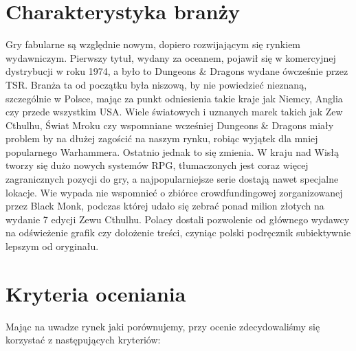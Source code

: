 \documentclass[a4paper,11pt]{article}
\begin{document}
\setcounter{page}{2}

\section {Charakterystyka branży}

Gry fabularne są względnie nowym, dopiero rozwijającym się rynkiem wydawniczym. Pierwszy tytuł, wydany za oceanem, pojawił się w komercyjnej dystrybucji w roku 1974, a było to Dungeons \& Dragons wydane ówcześnie przez TSR. Branża ta od początku była niszową, by nie powiedzieć nieznaną, szczególnie w Polsce, mając za punkt odniesienia takie kraje jak Niemcy, Anglia czy przede wszystkim USA. Wiele światowych i uznanych marek takich jak Zew Cthulhu, Świat Mroku czy wspomniane wcześniej Dungeons \& Dragons miały problem by na dłużej zagościć na naszym rynku, robiąc wyjątek dla mniej popularnego Warhammera. Ostatnio jednak to się zmienia. W kraju nad Wisłą tworzy się dużo nowych systemów RPG, tłumaczonych jest coraz więcej zagranicznych pozycji do gry, a najpopularniejsze serie dostają nawet specjalne lokacje. Wie wypada nie wspomnieć o zbiórce crowdfundingowej zorganizowanej przez Black Monk, podczas której udało się zebrać ponad milion złotych na wydanie 7 edycji Zewu Cthulhu. Polacy dostali pozwolenie od głównego wydawcy na odświeżenie grafik czy dołożenie treści, czyniąc polski podręcznik subiektywnie lepszym od oryginału.

\section {Kryteria oceniania}

Mając na uwadze rynek jaki porównujemy, przy ocenie zdecydowaliśmy się korzystać z następujących kryteriów:
\end{document}
